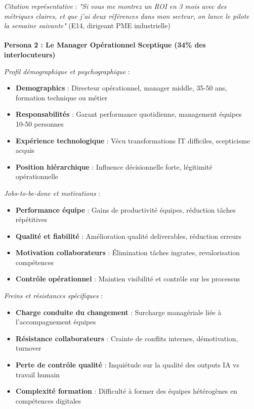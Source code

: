 \medskip
\emph{Citation représentative} : \emph{"Si vous me montrez un ROI en 3 mois avec des métriques claires, et que j'ai deux références dans mon secteur, on lance le pilote la semaine suivante"} (E14, dirigeant PME industrielle)
\\\\
\textbf{Persona 2 : Le Manager Opérationnel Sceptique (34\% des interlocuteurs)}

\emph{Profil démographique et psychographique} :
\begin{itemize}
    \item \textbf{Demographics} : Directeur opérationnel, manager middle, 35-50 ans, formation technique ou métier
    \item \textbf{Responsabilités} : Garant performance quotidienne, management équipes 10-50 personnes
    \item \textbf{Expérience technologique} : Vécu transformations IT difficiles, scepticisme acquis
    \item \textbf{Position hiérarchique} : Influence décisionnelle forte, légitimité opérationnelle
\end{itemize}
\medskip
\emph{Jobs-to-be-done et motivations} :
\begin{itemize}
    \item \textbf{Performance équipe} : Gains de productivité équipes, réduction tâches répétitives
    \item \textbf{Qualité et fiabilité} : Amélioration qualité deliverables, réduction erreurs
    \item \textbf{Motivation collaborateurs} : Élimination tâches ingrates, revalorisation compétences
    \item \textbf{Contrôle opérationnel} : Maintien visibilité et contrôle sur les processus
\end{itemize}
\medskip
\emph{Freins et résistances spécifiques} :
\begin{itemize}
    \item \textbf{Charge conduite du changement} : Surcharge managériale liée à l'accompagnement équipes
    \item \textbf{Résistance collaborateurs} : Crainte de conflits internes, démotivation, turnover
    \item \textbf{Perte de contrôle qualité} : Inquiétude sur la qualité des outputs IA vs travail humain
    \item \textbf{Complexité formation} : Difficulté à former des équipes hétérogènes en compétences digitales
\end{itemize}
